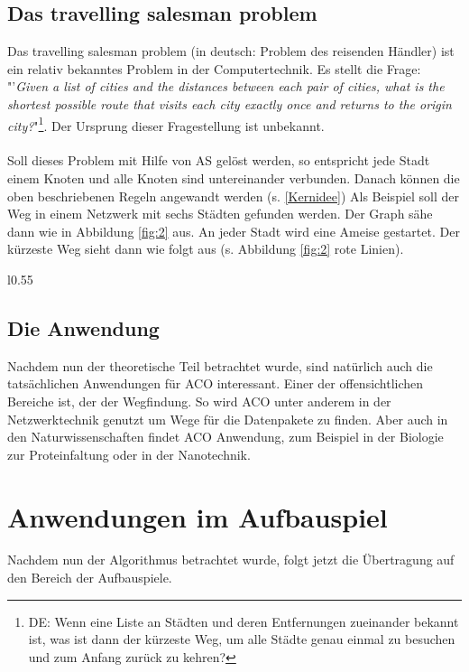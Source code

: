 \documentclass[12pt]{article}
\begin{document}
\subsection[TSP]{Das travelling salesman problem}\label{TSP}
Das travelling salesman problem (in deutsch: Problem des reisenden Händler) ist ein relativ bekanntes Problem 
in der Computertechnik. Es stellt die Frage:
"'\textit{Given a list of cities and the distances between each pair of cities, what is the shortest possible route that visits each city exactly once and returns to the origin city?}"\cite{wiki_TSP}\footnote{DE: Wenn eine Liste an Städten und deren Entfernungen zueinander bekannt ist, was ist dann der kürzeste Weg, um alle Städte genau einmal zu besuchen und zum Anfang zurück zu kehren?}. Der Ursprung dieser Fragestellung ist unbekannt.\\\\
Soll dieses Problem mit Hilfe von AS gelöst werden, so entspricht jede Stadt einem Knoten und alle Knoten sind untereinander verbunden. Danach können die oben beschriebenen Regeln angewandt werden (s. \ref{Kernidee})
Als Beispiel soll der Weg in einem Netzwerk mit sechs Städten gefunden werden. Der Graph sähe dann wie in Abbildung \ref{fig:2} aus. An jeder Stadt wird eine Ameise gestartet. Der kürzeste Weg \cite{aco-sim} sieht dann wie folgt aus (s. Abbildung \ref{fig:2} rote Linien).
\begin{wrapfigure}[13]{l}{0.55\textwidth}
\centering
{}
\caption{Netzwerk an Städten}
\label{fig:2}
\end{wrapfigure}
\subsection{Die Anwendung}
Nachdem nun der theoretische Teil betrachtet wurde, sind natürlich auch die tatsächlichen Anwendungen für ACO interessant. Einer der offensichtlichen Bereiche ist, der der Wegfindung. So wird ACO unter anderem in der Netzwerktechnik genutzt um Wege für die Datenpakete zu finden. Aber auch in den Naturwissenschaften findet ACO Anwendung, zum Beispiel in der Biologie zur Proteinfaltung oder in der Nanotechnik. 
\section{Anwendungen im Aufbauspiel}
Nachdem nun der Algorithmus betrachtet wurde, folgt jetzt die Übertragung auf den Bereich der Aufbauspiele.
\end{document}
